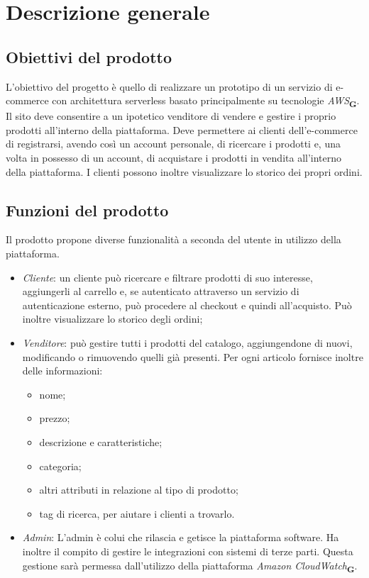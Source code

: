 \section{Descrizione generale}
\subsection{Obiettivi del prodotto}
L'obiettivo del progetto è quello di realizzare un prototipo di un servizio di e-commerce con architettura serverless basato principalmente su tecnologie \textit{AWS}\textsubscript{\textbf{G}}. Il sito deve consentire a un ipotetico venditore di vendere e gestire i proprio prodotti all'interno della piattaforma. Deve permettere ai clienti dell'e-commerce di registrarsi, avendo così un account personale, di ricercare i prodotti e, una volta in possesso di un account, di acquistare i prodotti in vendita all'interno della piattaforma. I clienti possono inoltre visualizzare lo storico dei propri ordini.
\subsection{Funzioni del prodotto}
Il prodotto propone diverse funzionalità a seconda del utente in utilizzo della piattaforma.
\begin{itemize}
    \item \textit{Cliente}: un cliente può ricercare e filtrare prodotti di suo interesse, aggiungerli al carrello e, se autenticato attraverso un servizio di autenticazione esterno, può procedere al checkout e quindi all'acquisto. Può inoltre visualizzare lo storico degli ordini;
    \item \textit{Venditore}: può gestire tutti i prodotti del catalogo, aggiungendone di nuovi, modificando o rimuovendo quelli già presenti. Per ogni articolo fornisce inoltre delle  informazioni:
          \begin{itemize}
              \item nome;
              \item prezzo;
              \item descrizione e caratteristiche;
              \item categoria;
              \item altri attributi in relazione al tipo di prodotto;
              \item tag di ricerca, per aiutare i clienti a trovarlo.
          \end{itemize}
    \item \textit{Admin}: L'admin è colui che rilascia e getisce la piattaforma software. Ha inoltre il compito di gestire le integrazioni con sistemi di terze parti. Questa gestione sarà permessa dall'utilizzo della piattaforma \textit{Amazon CloudWatch}\textsubscript{\textbf{G}}.
\end{itemize}
